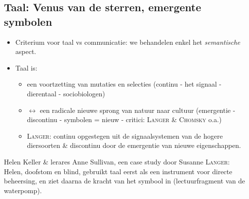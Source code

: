 \subsection{Taal: Venus van de sterren, emergente symbolen}
 \begin{itemize}
 \item Criterium voor taal vs communicatie: we behandelen enkel het \emph{semantische} aspect.
 \item Taal is: 
 \begin{itemize}
 \item een voortzetting van mutaties en selecties (continu - het signaal - dierentaal - sociobiologen)
 \item $\leftrightarrow$ een radicale nieuwe sprong van natuur naar cultuur (emergentie - discontinu - symbolen = nieuw - critici: \textsc{Langer \& Chomsky} o.a.)
 \item \textsc{Langer}: continu opgestegen uit de signaalsystemen van de hogere diersoorten \& discontinu door de emergentie van nieuwe eigenschappen.
 \end{itemize}
 \end{itemize}
 
Helen Keller \& lerares Anne Sullivan, een case study door Susanne \textsc{Langer}:
Helen, doofstom en blind, gebruikt taal eerst als een instrument voor directe beheersing, en ziet daarna de kracht van het symbool in (lectuurfragment van de waterpomp).

